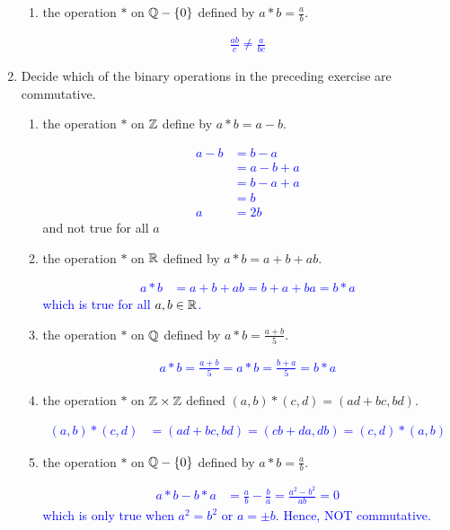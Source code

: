 \documentclass[10pt,a4paper]{report}
\newcommand{\BLUE}[1]{\textcolor{blue}{#1}}
\begin{document}
\begin{enumerate}
\begin{enumerate}
		\item the operation $*$ on $\mathbb{Q}-\{0\}$ defined by $a*b=\frac{a}{b}$.
		
		\BLUE{\begin{align*}
			\frac{ab}{c} \ne \frac{a}{bc}
		\end{align*}
		}
	\end{enumerate}
	
	\item Decide which of the binary operations in the preceding exercise are commutative.
	\begin{enumerate}
		\item the operation $*$ on $\mathbb{Z}$ define by $ a*b=a-b$.
		
		\BLUE{ \begin{align*}
			a-b &= b-a \\
			&= a-b+a\\
			&=b-a+a \\
			&=b \\
			a &= 2b
		\end{align*}} and not true for all $a$		  
		
		\item the operation $*$ on $\mathbb{R}$ defined by $a*b=a+b+ab$.
		
		\BLUE{
		\begin{align*}
			a*b &= a+b+ab = b+a+ba = b*a
		\end{align*}which is true for all $a,b \in \mathbb{R}$.
		}
		
		\item the operation $*$ on $\mathbb{Q}$ defined by $a*b=\frac{a+b}{5}$.
		
		\BLUE{
		\begin{align*}
			a*b=\frac{a+b}{5} = a*b=\frac{b+a}{5} = b*a
		\end{align*}
		}
		
		\item the operation $*$ on $\mathbb{Z} \times \mathbb{Z}$ defined $(a,b)*(c,d)=(ad+bc, bd)$.
		
		\BLUE{
		\begin{align*}
			(a,b)*(c,d)&=(ad+bc, bd) =(cb+da, db) = (c,d)*(a,b)
		\end{align*}
		}
		
		\item the operation $*$ on $\mathbb{Q}-\{0\}$ defined by $a*b=\frac{a}{b}$.
		
		\BLUE{
		\begin{align*}
			a*b - b*a &=\frac{a}{b} - \frac{b}{a} = \frac{a^2-b^2}{ab} =0
		\end{align*}which is only true when $a^2 = b^2$ or $a = \pm b$.  Hence, NOT commutative.
		}
		

\end{enumerate}
\end{enumerate}
\end{document}
